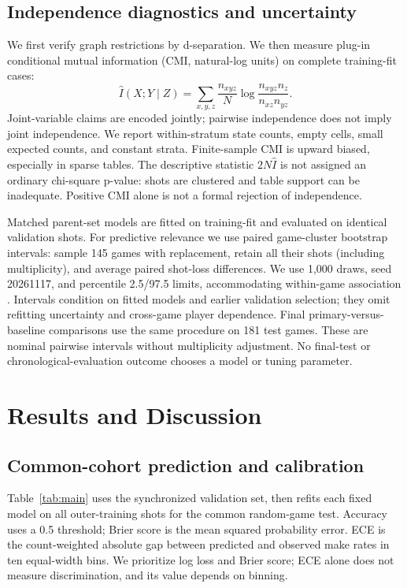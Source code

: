 \documentclass{article}
\begin{document}
\subsection{Independence diagnostics and uncertainty}
We first verify graph restrictions by d-separation. We then measure plug-in
conditional mutual information (CMI, natural-log units) on complete training-fit
cases:
\begin{equation}
\widehat I(X;Y\mid Z)=\sum_{x,y,z}\frac{n_{xyz}}N
\log\frac{n_{xyz}n_z}{n_{xz}n_{yz}}.
\end{equation}
Joint-variable claims are encoded jointly; pairwise independence does not imply
joint independence. We report within-stratum state counts, empty cells, small
expected counts, and constant strata. Finite-sample CMI is upward biased,
especially in sparse tables. The descriptive statistic $2N\widehat I$ is not
assigned an ordinary chi-square p-value: shots are clustered and table support
can be inadequate. Positive CMI alone is not a formal rejection of independence.

Matched parent-set models are fitted on training-fit and evaluated on identical
validation shots. For predictive relevance we use paired game-cluster bootstrap
intervals: sample 145 games with replacement, retain all their shots (including
multiplicity), and average paired shot-loss differences. We use 1,000 draws,
seed 20261117, and percentile 2.5/97.5 limits, accommodating within-game
association \citep{cluster}. Intervals condition on fitted models and earlier
validation selection; they omit refitting uncertainty and cross-game player
dependence. Final primary-versus-baseline comparisons use the same procedure on
181 test games. These are nominal pairwise intervals without multiplicity adjustment.
No final-test or chronological-evaluation outcome chooses a model or tuning parameter.

\section{Results and Discussion}
\subsection{Common-cohort prediction and calibration}
Table~\ref{tab:main} uses the synchronized validation set, then refits each fixed
model on all outer-training shots for the common random-game test. Accuracy uses
a 0.5 threshold; Brier score is the mean squared probability error. ECE is the
count-weighted absolute gap between predicted and observed make rates in ten
equal-width bins. We prioritize log loss and Brier score; ECE alone does not
measure discrimination, and its value depends on binning.
\end{document}
